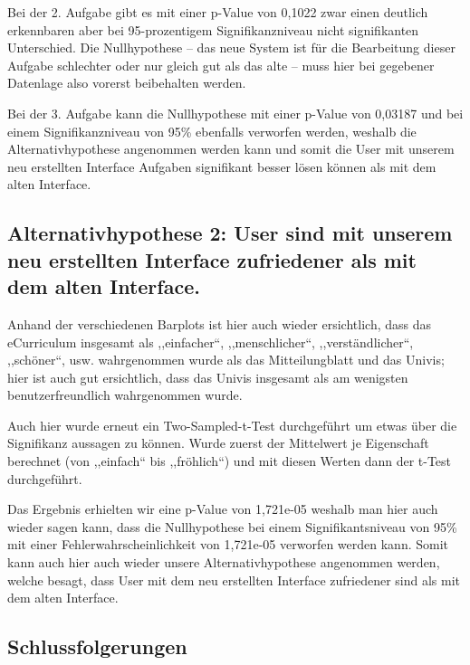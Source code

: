 \documentclass[a4paper,10pt]{scrartcl}
\begin{document}
\medskip

Bei der 2. Aufgabe gibt es mit einer p-Value von 0,1022 zwar einen deutlich erkennbaren aber bei 95-prozentigem Signifikanzniveau nicht signifikanten Unterschied. Die Nullhypothese -- das neue System ist für die Bearbeitung dieser Aufgabe schlechter oder nur gleich gut als das alte -- muss hier bei gegebener Datenlage also vorerst beibehalten werden.

\medskip

Bei der 3. Aufgabe kann die Nullhypothese mit einer p-Value von 0,03187 und bei einem Signifikanzniveau von 95\% ebenfalls verworfen werden, weshalb die Alternativhypothese angenommen werden kann und somit die User mit unserem neu erstellten Interface Aufgaben signifikant besser lösen können als mit dem alten Interface.

\subsection{Alternativhypothese 2: User sind mit unserem neu erstellten Interface zufriedener als mit dem alten Interface. }

Anhand der verschiedenen Barplots ist hier auch wieder ersichtlich, dass das eCurriculum insgesamt als ,,einfacher``, ,,menschlicher``, ,,verständlicher``, ,,schöner``, usw. wahrgenommen wurde als das Mitteilungblatt und das Univis; hier ist auch gut ersichtlich, dass das Univis insgesamt als am wenigsten benutzerfreundlich wahrgenommen wurde. 

\medskip

Auch hier wurde erneut ein Two-Sampled-t-Test durchgeführt um etwas über die Signifikanz aussagen zu können. 
Wurde zuerst der Mittelwert je Eigenschaft berechnet (von ,,einfach`` bis ,,fröhlich``) und mit diesen Werten dann der t-Test durchgeführt.

\medskip

Das Ergebnis erhielten wir eine p-Value von 1,721e-05 weshalb man hier auch wieder sagen kann, dass die Nullhypothese bei
einem Signifikantsniveau von 95\% mit einer Fehlerwahrscheinlichkeit von 1,721e-05 verworfen werden kann. Somit kann auch hier auch wieder unsere Alternativhypothese angenommen werden, welche besagt, dass User mit dem neu erstellten Interface zufriedener sind als mit dem alten Interface.

\subsection{Schlussfolgerungen}
\end{document}
